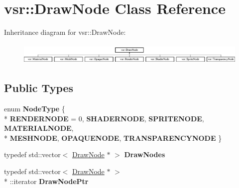 \hypertarget{classvsr_1_1_draw_node}{\section{vsr\-:\-:Draw\-Node Class Reference}
\label{classvsr_1_1_draw_node}
}
Inheritance diagram for vsr\-:\-:Draw\-Node\-:\begin{figure}[H]
\begin{center}
\leavevmode
\includegraphics[height=1.045752cm]{classvsr_1_1_draw_node}
\end{center}
\end{figure}
\subsection*{Public Types}
\begin{DoxyCompactItemize}
\item 
enum {\bfseries Node\-Type} \{ \\*
{\bfseries R\-E\-N\-D\-E\-R\-N\-O\-D\-E} =  0, 
{\bfseries S\-H\-A\-D\-E\-R\-N\-O\-D\-E}, 
{\bfseries S\-P\-R\-I\-T\-E\-N\-O\-D\-E}, 
{\bfseries M\-A\-T\-E\-R\-I\-A\-L\-N\-O\-D\-E}, 
\\*
{\bfseries M\-E\-S\-H\-N\-O\-D\-E}, 
{\bfseries O\-P\-A\-Q\-U\-E\-N\-O\-D\-E}, 
{\bfseries T\-R\-A\-N\-S\-P\-A\-R\-E\-N\-C\-Y\-N\-O\-D\-E}
 \}
\item 
\hypertarget{classvsr_1_1_draw_node_a4d6376ea915da09c577b97f743c1b352}{typedef std\-::vector$<$ \hyperlink{classvsr_1_1_draw_node}{Draw\-Node} $\ast$ $>$ {\bfseries Draw\-Nodes}}\label{classvsr_1_1_draw_node_a4d6376ea915da09c577b97f743c1b352}

\item 
\hypertarget{classvsr_1_1_draw_node_a199e72bd4318172f2d08033b03189e2b}{typedef std\-::vector$<$ \hyperlink{classvsr_1_1_draw_node}{Draw\-Node} $\ast$ $>$\\*
\-::iterator {\bfseries Draw\-Node\-Ptr}}\label{classvsr_1_1_draw_node_a199e72bd4318172f2d08033b03189e2b}

\end{DoxyCompactItemize}
